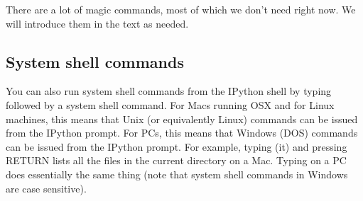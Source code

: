\documentclass[letterpaper,10pt,english]{sphinxmanual}
\begin{document}
\begin{sphinxVerbatim}[commandchars=\\\{\},numbers=left,firstnumber=1,stepnumber=1]

\end{sphinxVerbatim}

\sphinxAtStartPar
There are a lot of magic commands, most of which we don’t need right now.  We will introduce them in the text as needed.


\subsection{System shell commands}
\label{\detokenize{chap2/chap2_basics:system-shell-commands}}\label{\detokenize{chap2/chap2_basics:syscommands}}
\ignorespaces 
\sphinxAtStartPar
You can also run system shell commands from the IPython shell by typing \sphinxcode{\sphinxupquote{!}} followed by a system shell command.  For Macs running OSX and for Linux machines, this means that Unix (or equivalently Linux) commands can be issued from the IPython prompt.  For PCs, this means that Windows (DOS) commands can be issued from the IPython prompt.  For example, typing   (it) and pressing RETURN lists all the files in the current directory on a Mac.  Typing  on a PC does essentially the same thing (note that system shell commands in Windows are  case sensitive).

\ignorespaces 
\end{document}
